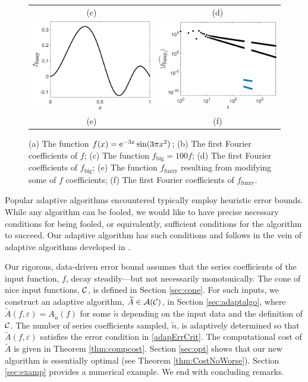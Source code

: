 \documentclass[graybox,footinfo]{svmult}
\begin{document}
\begin{figure}[ht]
\begin{tabular}{cc}
		\\ (c) & (d) \\
		\includegraphics[width=5.5cm]{ProgramsImages/Filtered.eps} &
		\includegraphics[width=5.5cm]{ProgramsImages/FilteredWalshFourierCoeffDecay.eps}
		\\ (e) & (f)
	\end{tabular}
	\caption{(a) The function $f(x)={\rm e}^{-3x}\sin(3\pi x^2)$; (b) The first Fourier coefficients of $f$; (c) The function $f_{\text{big}}=100f$; (d) The first Fourier coefficients of $f_{\text{big}}$; (e) The function $f_{\text{fuzzy}}$ resulting from modifying some of $f$ coefficients; (f) The first Fourier coefficients of $f_{\text{fuzzy}}$. \label{fig:fourier_example}}
\end{figure}

Popular adaptive algorithms encountered typically employ heuristic error bounds.  While any algorithm can be fooled, we would like to have precise necessary conditions for being fooled, or equivalently, sufficient conditions for the algorithm to succeed.  Our adaptive algorithm has such conditions and follows in the vein of adaptive algorithms developed in \cite{HicEtal14a, HIcEtal14b, HicJim16a, JimHic16a}.

Our rigorous, data-driven error bound assumes that the series coefficients of the input function, $f$, decay steadily---but not necessarily monotonically.  The cone of nice input functions, ${\mathcal{C}}$, is defined in Section \ref{sec:cone}.  For such inputs, we construct an adaptive algorithm, $\widetilde{A} \in {\mathcal{A}}({\mathcal{C}})$, in Section \ref{sec:adaptalgo},  where $\widetilde{A}(f,\varepsilon) = A_{\widetilde{n}}(f)$ for some $\widetilde{n}$ depending on the input data and the definition of ${\mathcal{C}}$.  The number of series coefficients sampled, $\widetilde{n}$, is adaptively determined so that $\widetilde{A}(f,\varepsilon)$ satisfies the error condition in \eqref{adapErrCrit}.  The computational cost of $\widetilde{A}$ is given in  Theorem \ref{thm:compcost}.  Section \ref{sec:opt} shows that our new algorithm is essentially optimal (see Theorem \ref{thm:CostNoWorse}).  Section \ref{sec:examp} provides a numerical example.  We end with concluding remarks. 
\end{document}
